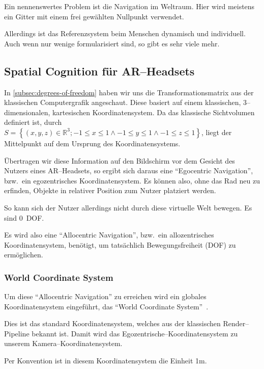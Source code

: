         Ein nennenswertes Problem ist die Navigation im Weltraum.
        Hier wird meistens ein Gitter mit einem frei gewählten Nullpunkt verwendet.

        Allerdings ist das Referenzsystem beim Menschen dynamisch und individuell.
        Auch wenn nur wenige formularisiert sind, so gibt es sehr viele mehr.

\subsection{Spatial Cognition für AR--Headsets}\label{subsec:spatial-cognition-fuer-ar-headsets}
    In \autoref{subsec:degrees-of-freedom} haben wir uns die Transformationsmatrix aus der klassischen Computergrafik angeschaut.
    Diese basiert auf einem klassischen, 3--dimensionalen, kartesischen Koordinatensystem.
    Da das klassische Sichtvolumen definiert ist, durch $S=\left\{(x,y,z)\in \mathbb{R}^3;-1\leq x\leq 1\land -1\leq y\leq 1\land -1\leq z\leq 1\right\}$, liegt der Mittelpunkt auf dem Ursprung des Koordinatensystems.

    Übertragen wir diese Information auf den Bildschirm vor dem Gesicht des Nutzers eines AR--Headsets, so ergibt sich daraus eine \enquote{Egocentric Navigation}, bzw.\ ein egozentrisches Koordinatensystem.
    Es können also, ohne das Rad neu zu erfinden, Objekte in relativer Position zum Nutzer platziert werden.

    So kann sich der Nutzer allerdings nicht durch diese virtuelle Welt bewegen.
    Es sind 0~DOF\@.

    Es wird also eine \enquote{Allocentric Navigation}, bzw.\ ein allozentrisches Koordinatensystem, benötigt, um tatsächlich Bewegungsfreiheit (DOF) zu ermöglichen.

    \subsubsection{World Coordinate System}\label{subsubsec:world-coordinate-system}
        Um diese \enquote{Allocentric Navigation} zu erreichen wird ein globales Koordinatensystem eingeführt, das \enquote{World Coordinate System}~\autocite{sean-kerawala-2022}.

        Dies ist das standard Koordinatensystem, welches aus der klassischen Render--Pipeline bekannt ist.
        Damit wird das Egozentrische--Koordinatensystem zu unserem Kamera--Koordinatensystem.

        Per Konvention ist in diesem Koordinatensystem die Einheit 1m.

